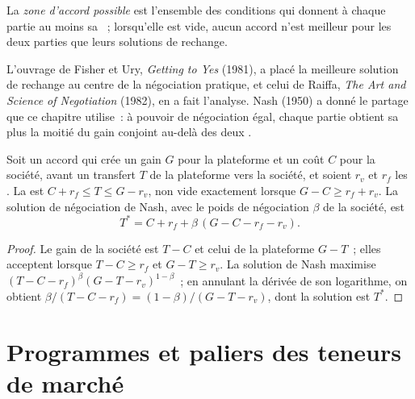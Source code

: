 \begin{definition}\label{def:fm:commercial-relationships-with-venues-brokers-and-vendors:zopa}
La \emph{zone d'accord possible} est l'ensemble des conditions qui donnent à chaque partie au moins sa ~;
lorsqu'elle est vide, aucun accord n'est meilleur pour les deux parties que leurs solutions de rechange.
\end{definition}

L'ouvrage de Fisher et Ury, \emph{Getting to Yes} (1981), a placé la meilleure solution de rechange au centre de la négociation pratique, et celui de Raiffa, \emph{The Art and
Science of Negotiation} (1982), en a fait l'analyse. Nash (1950) a donné le partage que ce chapitre utilise~: à pouvoir de négociation égal, chaque partie obtient sa  plus la moitié du gain conjoint au-delà des deux .

\begin{proposition}\label{prop:fm:commercial-relationships-with-venues-brokers-and-vendors:nash}
Soit un accord qui crée un gain $G$ pour la plateforme et un coût $C$ pour la société, avant un transfert $T$ de la plateforme vers la société, et soient
$r_v$ et $r_f$ les . La  est $C+r_f\le T\le G-r_v$, non vide exactement lorsque $G-C\ge r_f+r_v$. La
solution de négociation de Nash, avec le poids de négociation $\beta$ de la société, est
\[
T^*=C+r_f+\beta\,(G-C-r_f-r_v).
\]
\end{proposition}

\begin{proof}
Le gain de la société est $T-C$ et celui de la plateforme $G-T$~; elles acceptent lorsque $T-C\ge r_f$ et $G-T\ge r_v$. La solution de Nash maximise
$(T-C-r_f)^\beta(G-T-r_v)^{1-\beta}$~; en annulant la dérivée de son logarithme, on obtient $\beta/(T-C-r_f)=(1-\beta)/(G-T-r_v)$, dont la solution est
$T^*$.
\end{proof}

\section{Programmes et paliers des teneurs de marché}

